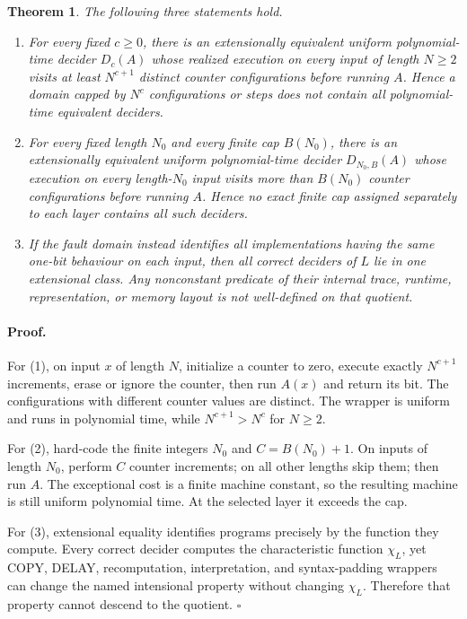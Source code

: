 \documentclass[11pt]{article}
\newtheorem{theorem}{Theorem}
\begin{document}
\begin{theorem}
The following three statements hold.
\begin{enumerate}
\item For every fixed \(c\ge0\), there is an extensionally equivalent uniform
polynomial-time decider \(D_c(A)\) whose realized execution on every input of
length \(N\ge2\) visits at least \(N^{c+1}\) distinct counter configurations
before running \(A\).  Hence a domain capped by \(N^c\) configurations or
steps does not contain all polynomial-time equivalent deciders.
\item For every fixed length \(N_0\) and every finite cap \(B(N_0)\), there is
an extensionally equivalent uniform polynomial-time decider
\(D_{N_0,B}(A)\) whose execution on every length-\(N_0\) input visits more
than \(B(N_0)\) counter configurations before running \(A\).  Hence no exact
finite cap assigned separately to each layer contains all such deciders.
\item If the fault domain instead identifies all implementations having the
same one-bit behaviour on each input, then all correct deciders of \(L\) lie
in one extensional class.  Any nonconstant predicate of their internal trace,
runtime, representation, or memory layout is not well-defined on that
quotient.
\end{enumerate}
\end{theorem}

\paragraph{Proof.}
For (1), on input \(x\) of length \(N\), initialize a counter to zero, execute
exactly \(N^{c+1}\) increments, erase or ignore the counter, then run \(A(x)\)
and return its bit.  The configurations with different counter values are
distinct.  The wrapper is uniform and runs in polynomial time, while
\(N^{c+1}>N^c\) for \(N\ge2\).

For (2), hard-code the finite integers \(N_0\) and
\(C=B(N_0)+1\).  On inputs of length \(N_0\), perform \(C\) counter
increments; on all other lengths skip them; then run \(A\).  The exceptional
cost is a finite machine constant, so the resulting machine is still uniform
polynomial time.  At the selected layer it exceeds the cap.

For (3), extensional equality identifies programs precisely by the function
they compute.  Every correct decider computes the characteristic function
\(\chi_L\), yet COPY, DELAY, recomputation, interpretation, and syntax-padding
wrappers can change the named intensional property without changing
\(\chi_L\).  Therefore that property cannot descend to the quotient.
\hfill\(\square\)
\end{document}
